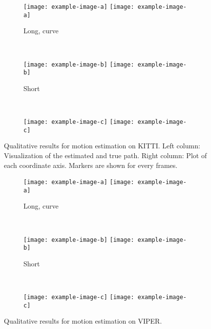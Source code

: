 		\begin{figure}
			\centering
			\begin{subfigure}[b]{\linewidth}
				\centering
				\texttt{[image: example-image-a]}
				\texttt{[image: example-image-a]}
				\caption{
					Long, curve
					\label{fig:0}
				}
			\end{subfigure}%
			\\
			\begin{subfigure}[b]{\linewidth}
				\centering
				\texttt{[image: example-image-b]}
				\texttt{[image: example-image-b]}
				\caption{
					Short
					\label{fig:0}
				}
			\end{subfigure}%
			\\
			\begin{subfigure}[b]{\linewidth}
				\centering
				\texttt{[image: example-image-c]}
				\texttt{[image: example-image-c]}
				\caption{
					\label{fig:0}
				}
			\end{subfigure}%
			\caption[Qualitative results for motion estimation on KITTI]
					{Qualitative results for motion estimation on KITTI.
				 Left column: Visualization of the estimated and true path.
				 Right column: Plot of each coordinate axis.
				 Markers are shown for every  frames.
					\label{fig:0}}
		\end{figure}


		\begin{figure}
			\centering
			\begin{subfigure}[b]{\linewidth}
				\centering
				\texttt{[image: example-image-a]}
				\texttt{[image: example-image-a]}
				\caption{
					Long, curve
					\label{fig:0}
				}
			\end{subfigure}%
			\\
			\begin{subfigure}[b]{\linewidth}
				\centering
				\texttt{[image: example-image-b]}
				\texttt{[image: example-image-b]}
				\caption{
					Short
					\label{fig:0}
				}
			\end{subfigure}%
			\\
			\begin{subfigure}[b]{\linewidth}
				\centering
				\texttt{[image: example-image-c]}
				\texttt{[image: example-image-c]}
				\caption{
					\label{fig:0}
				}
			\end{subfigure}%
			\caption[Qualitative results for motion estimation on VIPER]
					{Qualitative results for motion estimation on VIPER.
				 \label{fig:0}}
		\end{figure}
